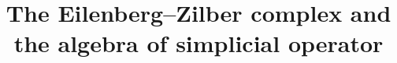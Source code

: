 \documentclass{amsart}
\theoremstyle{definition}
\begin{document}
	\title{The Eilenberg--Zilber complex and the algebra of simplicial operator}
	
	\maketitle
	
	
	
	
	
	
\end{document}
